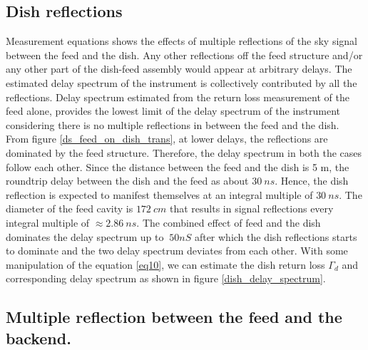 \documentclass[twocolumn]{emulateapj}
\begin{document}
    
    \subsection{Dish reflections}
    
    Measurement equations shows the effects of multiple reflections of the sky
    signal between the feed and the dish. Any other reflections off the feed
    structure and/or any other part of the dish-feed assembly would appear at
    arbitrary delays. The estimated delay spectrum of the instrument is
    collectively contributed by all the reflections. Delay spectrum estimated from
    the return loss measurement of the feed alone,  provides the lowest limit of
    the delay spectrum of the instrument considering there is no multiple
    reflections in between the feed and the dish.  From figure
    \ref{ds_feed_on_dish_trans}, at lower delays, the reflections are dominated by
    the feed structure. Therefore, the delay spectrum in both the cases follow each
    other. Since the distance between the feed and the dish is 5 m, the roundtrip
    delay between the dish and the feed as about $30~ns$. Hence, the dish
    reflection is expected to manifest themselves at an integral multiple of
    $30~ns$. The diameter of the feed cavity is $172~cm$  that results in signal
    reflections every integral multiple of $\approx2.86~ns$. The combined effect of
    feed and the dish dominates the delay spectrum up to $\> 50nS$ after which the
    dish reflections starts to dominate and the two delay spectrum deviates from
    each other. With some manipulation of the equation \ref{eq10}, we can estimate
    the dish return loss $\Gamma_{d}$ and corresponding delay spectrum as shown in
    figure \ref{dish_delay_spectrum}.
    
    \subsection{Multiple reflection between the feed and the backend.}
    
\end{document}
